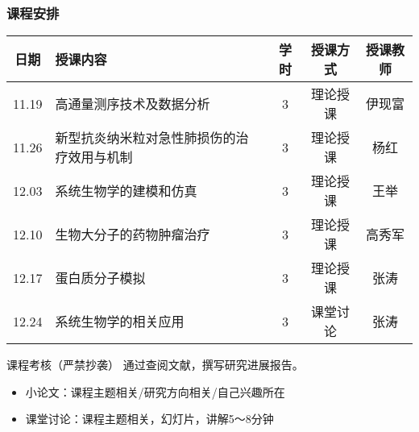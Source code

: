 \begin{frame}
  \frametitle{课程安排}
  \begin{table}
    \centering
    \begin{tabular}{clccc}
      \hline
      \rowcolor{blue!50}日期 & 授课内容 & 学时 & 授课方式 & 授课教师\\
      \hline
      11.19 & 高通量测序技术及数据分析 & 3 & 理论授课 & 伊现富\\
      11.26 & \tiny{新型抗炎纳米粒对急性肺损伤的治疗效用与机制} & 3 & 理论授课 & 杨红\\
      12.03 & 系统生物学的建模和仿真 & 3 & 理论授课 & 王举\\
      12.10 & 生物大分子的药物肿瘤治疗 & 3 & 理论授课 & 高秀军\\
      12.17 & 蛋白质分子模拟 & 3 & 理论授课 & 张涛\\
      12.24 & 系统生物学的相关应用 & 3 & 课堂讨论 & 张涛\\
      \hline
    \end{tabular}
  \end{table}
  \vspace{-1em}
  \begin{block}{课程考核（\alert{严禁抄袭}）}
    通过查阅文献，撰写研究进展报告。
    \begin{itemize}
      \item 小论文：课程主题相关/研究方向相关/自己兴趣所在
      \item 课堂讨论：课程主题相关，幻灯片，讲解5～8分钟
    \end{itemize}
  \end{block}
\end{frame}
